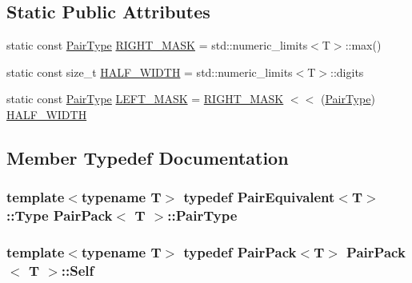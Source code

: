 \subsection*{Static Public Attributes}
\begin{DoxyCompactItemize}
\item 
static const \hyperlink{structPairPack_a53b73bc7e25b709c22cc92e2d0705512}{Pair\-Type} \hyperlink{structPairPack_a214b8ee29343fc0ff8f99f5720133346}{R\-I\-G\-H\-T\-\_\-\-M\-A\-S\-K} = std\-::numeric\-\_\-limits$<$T$>$\-::max()
\item 
static const size\-\_\-t \hyperlink{structPairPack_a75dce9fb9be36ef071cffa2ba07d9800}{H\-A\-L\-F\-\_\-\-W\-I\-D\-T\-H} = std\-::numeric\-\_\-limits$<$T$>$\-::digits
\item 
static const \hyperlink{structPairPack_a53b73bc7e25b709c22cc92e2d0705512}{Pair\-Type} \hyperlink{structPairPack_a8fcce8c8a751f7b2a24b02afae40bfe0}{L\-E\-F\-T\-\_\-\-M\-A\-S\-K} = \hyperlink{structPairPack_a214b8ee29343fc0ff8f99f5720133346}{R\-I\-G\-H\-T\-\_\-\-M\-A\-S\-K} $<$$<$ (\hyperlink{structPairPack_a53b73bc7e25b709c22cc92e2d0705512}{Pair\-Type}) \hyperlink{structPairPack_a75dce9fb9be36ef071cffa2ba07d9800}{H\-A\-L\-F\-\_\-\-W\-I\-D\-T\-H}
\end{DoxyCompactItemize}


\subsection{Member Typedef Documentation}
\hypertarget{structPairPack_a53b73bc7e25b709c22cc92e2d0705512}{
\subsubsection[{Pair\-Type}]{\setlength{\rightskip}{0pt plus 5cm}template$<$typename T$>$ typedef {\bf Pair\-Equivalent}$<$T$>$\-::Type {\bf Pair\-Pack}$<$ T $>$\-::{\bf Pair\-Type}}}\label{structPairPack_a53b73bc7e25b709c22cc92e2d0705512}
\hypertarget{structPairPack_aa208c22c3bba7a849ec3039e93a8216d}{
\subsubsection[{Self}]{\setlength{\rightskip}{0pt plus 5cm}template$<$typename T$>$ typedef {\bf Pair\-Pack}$<$T$>$ {\bf Pair\-Pack}$<$ T $>$\-::{\bf Self}}}\label{structPairPack_aa208c22c3bba7a849ec3039e93a8216d}


